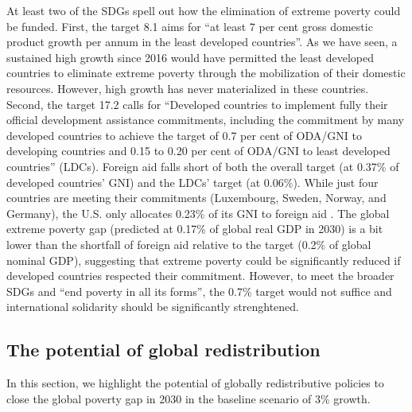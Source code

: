 At least two of the SDGs spell out how the elimination of extreme poverty could be funded. %
First, the target 8.1 aims for ``at least 7 per cent gross domestic product growth per annum in the least developed countries''. As we have seen, a sustained high growth since 2016 would have permitted the least developed countries to eliminate extreme poverty through the mobilization of their domestic resources. However, high growth has never materialized in these countries. 
Second, the target 17.2 calls for ``Developed countries to implement fully their official development assistance commitments, including the commitment by many developed countries to achieve the target of 0.7 per cent of ODA/GNI to developing countries and 0.15 to 0.20 per cent of ODA/GNI to least developed countries'' (LDCs). Foreign aid falls short of both the overall target (at 0.37\% of developed countries' GNI) and the LDCs' target (at 0.06\%). While just four countries are meeting their commitments (Luxembourg, Sweden, Norway, and Germany), the U.S. only allocates 0.23\% of its GNI to foreign aid \citep{oecd_oda_2023}. The global extreme poverty gap (predicted at 0.17\% of global real GDP in 2030) is a bit lower than the shortfall of foreign aid relative to the target (0.2\% of global nominal GDP), suggesting that extreme poverty could be significantly reduced if developed countries respected their commitment. %
However, to meet the broader SDGs and ``end poverty in all its forms'', the 0.7\% target would not suffice and international solidarity should be significantly strenghtened. %

\subsection{The potential of global redistribution} %

In this section, we highlight the potential of globally redistributive policies to close the global poverty gap in 2030 in the baseline scenario of 3\% growth. %


